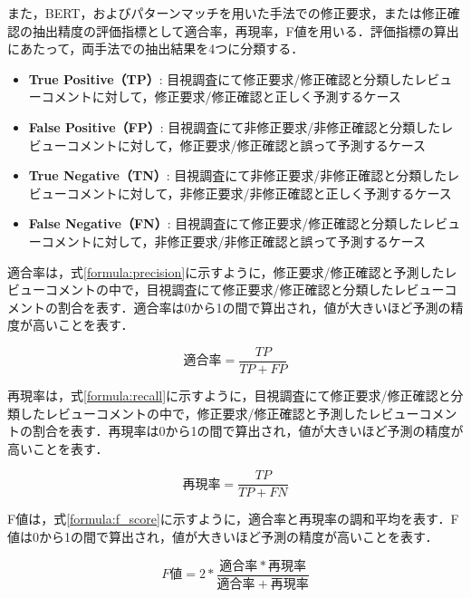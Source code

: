 \documentclass[11pt]{jreport}
\begin{document}
また，BERT，およびパターンマッチを用いた手法での修正要求，または修正確認の抽出精度の評価指標として適合率，再現率，F値を用いる．評価指標の算出にあたって，両手法での抽出結果を4つに分類する．

\begin{itemize}
\item \textbf{True Positive（TP）}: 目視調査にて修正要求/修正確認と分類したレビューコメントに対して，修正要求/修正確認と正しく予測するケース
\item \textbf{False Positive（FP）}: 目視調査にて非修正要求/非修正確認と分類したレビューコメントに対して，修正要求/修正確認と誤って予測するケース
\item \textbf{True Negative（TN）}: 目視調査にて非修正要求/非修正確認と分類したレビューコメントに対して，非修正要求/非修正確認と正しく予測するケース
\item \textbf{False Negative（FN）}: 目視調査にて修正要求/修正確認と分類したレビューコメントに対して，非修正要求/非修正確認と誤って予測するケース
\end{itemize}

適合率は，式\ref{formula:precision}に示すように，修正要求/修正確認と予測したレビューコメントの中で，目視調査にて修正要求/修正確認と分類したレビューコメントの割合を表す．適合率は0から1の間で算出され，値が大きいほど予測の精度が高いことを表す．

\begin{equation}
適合率 = \frac{TP}{TP+FP}\label{formula:precision}
\end{equation}

再現率は，式\ref{formula:recall}に示すように，目視調査にて修正要求/修正確認と分類したレビューコメントの中で，修正要求/修正確認と予測したレビューコメントの割合を表す．再現率は0から1の間で算出され，値が大きいほど予測の精度が高いことを表す．

\begin{equation}
再現率 = \frac{TP}{TP+FN}\label{formula:recall}
\end{equation}

F値は，式\ref{formula:f_score}に示すように，適合率と再現率の調和平均を表す．F値は0から1の間で算出され，値が大きいほど予測の精度が高いことを表す．

\begin{equation}
F値 = 2*\frac{適合率*再現率}{適合率+再現率}\label{formula:f_score}
\end{equation}
\end{document}
